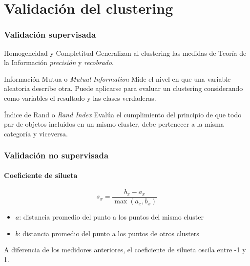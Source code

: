 \section{Validación del clustering}\label{sec:validation}

\begin{frame}
    \frametitle{Validación supervisada}

    \pause
    \begin{block}{Homogeneidad y Completitud}
        Generalizan al clustering las medidas de Teoría de la Información \textit{precisión} y \textit{recobrado}.
    \end{block}

    \pause
    \begin{block}{Información Mutua o \textit{Mutual Information}}
        Mide el nivel en que una variable aleatoria describe otra.
        Puede aplicarse para evaluar un clustering considerando como variables el resultado y las clases verdaderas.
    \end{block}

    \pause
    \begin{block}{Índice de Rand o \textit{Rand Index}}
        Evalúa el cumplimiento del principio de que todo par de objetos incluidos en un mismo cluster, debe pertenecer a la misma categoría y viceversa.
    \end{block}

\end{frame}

\begin{frame}
    \frametitle{Validación no supervisada}
    \framesubtitle{Coeficiente de silueta}

    \pause
    \begin{equation*}
        s_x = \frac{b_x - a_x}{\max{(a_x, b_x)}}
    \end{equation*}

    \pause
    \begin{itemize}
        \item $a$: distancia promedio del punto a los puntos del mismo cluster
        \item $b$: distancia promedio del punto a los puntos de otros clusters
    \end{itemize}

    \pause
    A diferencia de los medidores anteriores, el coeficiente de silueta oscila entre -1 y 1.

\end{frame}